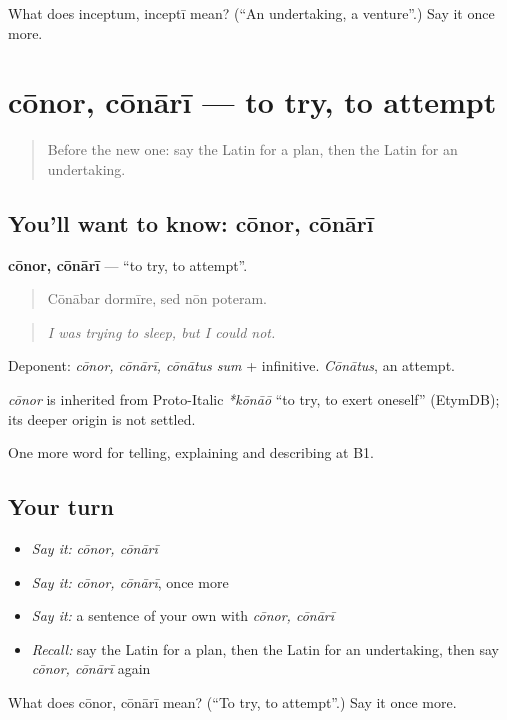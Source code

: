 \begin{tcolorbox}[breakable,colback=teal!4,colframe=teal!35!black,title={Before you move on}]
What does inceptum, inceptī mean? (\textquotedblleft{}An undertaking, a venture\textquotedblright{}.) Say it once more.
\end{tcolorbox}
\section[cōnor, cōnārī]{cōnor, cōnārī — to try, to attempt}

\label{lesson:LA-C393-conor}



\begin{quote}
Before the new one: say the Latin for a plan, then the Latin for an undertaking.
\end{quote}

\subsection*{You'll want to know: cōnor, cōnārī}
\textbf{cōnor, cōnārī} — \textquotedblleft{}to try, to attempt\textquotedblright{}.

\begin{quote}
Cōnābar dormīre, sed nōn poteram.
\end{quote}

\begin{quote}
\emph{I was trying to sleep, but I could not.}
\end{quote}

Deponent: \emph{cōnor, cōnārī, cōnātus sum} + infinitive. \emph{Cōnātus}, an attempt.

\begin{cousinweb}
\emph{cōnor} is inherited from Proto-Italic \emph{*kōnāō} \textquotedblleft{}to try, to exert oneself\textquotedblright{} (EtymDB); its deeper origin is not settled.
\end{cousinweb}

\begin{grammarlens}[title={What you've built}]
One more word for telling, explaining and describing at B1.
\end{grammarlens}

\subsection*{Your turn}
\begin{itemize}
\raggedright
  \item \emph{Say it:} \emph{cōnor, cōnārī}
  \item \emph{Say it:} \emph{cōnor, cōnārī}, once more
  \item \emph{Say it:} a sentence of your own with \emph{cōnor, cōnārī}
  \item \emph{Recall:} say the Latin for a plan, then the Latin for an undertaking, then say \emph{cōnor, cōnārī} again
\end{itemize}

\begin{tcolorbox}[breakable,colback=teal!4,colframe=teal!35!black,title={Before you move on}]
What does cōnor, cōnārī mean? (\textquotedblleft{}To try, to attempt\textquotedblright{}.) Say it once more.
\end{tcolorbox}
